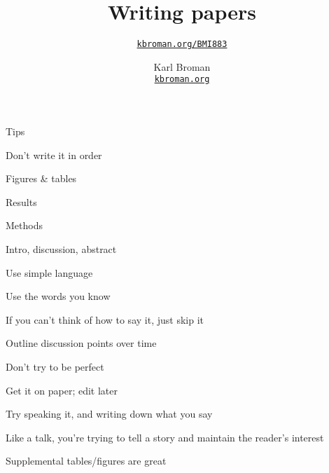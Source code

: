 \documentclass[aspectratio=169,12pt,t]{beamer}
\title{Writing papers}
\subtitle{}
\author{\href{https://kbroman.org/BMI883}{\tt kbroman.org/BMI883} }
\institute{}
\date{\small \hspace{3in} Karl Broman \\
  \hspace{3in} \href{https://kbroman.org}{\color{foreground}
    \small \tt kbroman.org}}
\begin{document}
{
\frame{
  \titlepage
} }




\begin{frame}{Tips}

      \bi
    \item Don't write it in order
      \bi
    \item Figures \& tables
    \item Results
    \item Methods
    \item Intro, discussion, abstract
      \ei
    \item Use simple language
      \bi
    \item Use the words you know
    \item If you can't think of how to say it, just skip it
      \ei
    \item Outline discussion points over time
    \item Don't try to be perfect
      \bi
    \item Get it on paper; edit later
      \ei
    \item Try speaking it, and writing down what you say
      \bi
      \item Like a talk, you're trying to tell a story and maintain
        the reader's interest
      \ei
    \item Supplemental tables/figures are great
    \ei


\end{frame}
\end{document}
